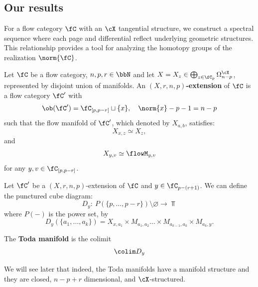 \subsection*{Our results}
For a flow category $\fC$ with an $\cX$ tangential structure, we construct a spectral sequence where each page and differential reflect underlying geometric structures. This relationship provides a tool for analyzing the homotopy groups of the realization $\norm{\fC}$.

\begin{defn}\label{def:Xrnp-extension}
Let $\fC$ be a flow category, $n,p,r \in \bbN$ and let $X = {X_z} \in \bigoplus_{z \in \fC_p} \Omega^{\operatorname{\cX}}_{n - p}$, represented by disjoint union of manifolds.
An \textbf{$(X,r,n,p)$-extension} of $\fC$ is a flow category $\fC'$ with
\begin{equation*}
    \ob(\fC') = \fC_{[p,p-r]} \sqcup \{x\},\quad \norm{x}-p-1 = n-p
\end{equation*}
such that the flow manifold of $\fC'$, which denoted by $X_{a,b}$, satisfies:
\begin{equation*}
    X_{x, z} \simeq X_z,
\end{equation*}
and
\begin{equation*}
    X_{y,v} \simeq \flowM_{y,v}
\end{equation*}
for any $y,v \in \fC_{[p,p-r]}$.
\end{defn}
\begin{defn}\label{def:smallToda}
    Let $\fC'$ be a $(X,r,n,p)$-extension of $\fC$ and $y \in \fC_{p-(r+1)}$. We can define the punctured cube diagram:
    \begin{equation*}
        D_y: \ P(\{p,\dots,p-r\}) \setminus \varnothing \to \Top
    \end{equation*}
    where $P(-)$ is the power set, by
    \begin{equation*}
        D_y(\{a_1, \dots, a_k\}) = X_{x,a_1} \times M_{a_1,a_2} \dots \times M_{a_{k-1},a_k} \times M_{a_k,y}.
    \end{equation*}
    
    The \textbf{Toda manifold} is the colimit
    \begin{equation*}
        \colim D_y
    \end{equation*}
\end{defn}
We will see later that indeed, the Toda manifolds have a manifold structure and they are closed, $n-p+r$ dimensional, and $\cX$-structured.

